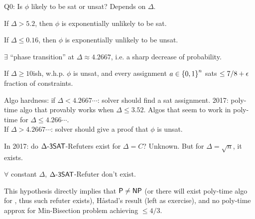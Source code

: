 \documentclass{article}
\begin{document}
Q0: Is \(\phi\) likely to be sat or unsat? Depends on \(\Delta\).

\begin{exercise}
  If \(\Delta > 5.2\), then \(\phi\) is exponentially unlikely to be sat.
\end{exercise}

\begin{theorem}
  If \(\Delta \leq 0.16\), then \(\phi\) is exponentially unlikely to be unsat.
\end{theorem}

\begin{conjecture}
  \(\exists\) ``phase transition'' at \(\Delta \approx 4.2667\), i.e. a sharp decrease of probability.
\end{conjecture}

\begin{exercise}
  If \(\Delta \geq 10\)ish, w.h.p. \(\phi\) is unsat, and every assignment \(a \in \left\lbrace 0, 1 \right\rbrace^n\)  sats \(\leq 7/8 + \epsilon\) fraction of constraints.
\end{exercise}

Algo hardness: if \(\Delta < 4.2667\cdots\): solver should find a sat assignment.
2017: poly-time algo that provably works when \(\Delta \leq 3.52\).
Algos that seem to work in poly-time for \(\Delta \leq 4.266\cdots\). \\
If \(\Delta > 4.2667\cdots\): solver should give a proof that \(\phi\) is unsat.


In 2017: do \(\Delta\text{\sf -3SAT}\)-Refuters exist for \(\Delta = C\)? Unknown. But for \(\Delta = \sqrt{n}\), it exists.

\begin{hypothesis}
  \(\forall\) constant \(\Delta\), \(\Delta\text{\sf -3SAT}\)-Refuter don't exist.
\end{hypothesis}

This hypothesis directly implies that \(\text{\sf P} \neq \text{\sf NP}\) (or there will exist poly-time algo for , thus such refuter exists), Håstad's result (left as exercise), and no poly-time approx for Min-Bisection problem achieving \(\leq 4/3\).
\end{document}
